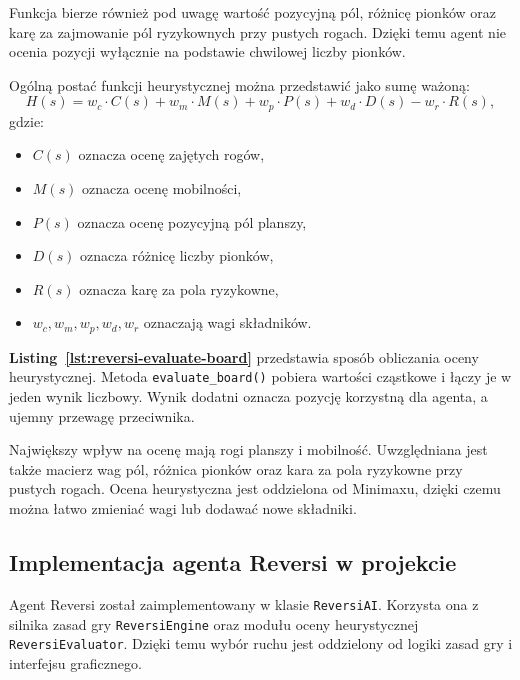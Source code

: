 Funkcja bierze również pod uwagę wartość pozycyjną pól, różnicę pionków oraz karę za zajmowanie pól ryzykownych przy pustych rogach. Dzięki temu agent nie ocenia pozycji wyłącznie na podstawie chwilowej liczby pionków.

Ogólną postać funkcji heurystycznej można przedstawić jako sumę ważoną:
\begin{equation*}
H(s) =
w_c \cdot C(s)
+ w_m \cdot M(s)
+ w_p \cdot P(s)
+ w_d \cdot D(s)
- w_r \cdot R(s),
\end{equation*}
gdzie:
\begin{itemize}
\item $C(s)$ oznacza ocenę zajętych rogów,
\item $M(s)$ oznacza ocenę mobilności,
\item $P(s)$ oznacza ocenę pozycyjną pól planszy,
\item $D(s)$ oznacza różnicę liczby pionków,
\item $R(s)$ oznacza karę za pola ryzykowne,
\item $w_c, w_m, w_p, w_d, w_r$ oznaczają wagi składników.
\end{itemize}



\textbf{Listing~\ref{lst:reversi-evaluate-board}} przedstawia sposób obliczania oceny heurystycznej. Metoda \texttt{evaluate\_board()} pobiera wartości cząstkowe i łączy je w jeden wynik liczbowy. Wynik dodatni oznacza pozycję korzystną dla agenta, a ujemny przewagę przeciwnika.

Największy wpływ na ocenę mają rogi planszy i mobilność. Uwzględniana jest także macierz wag pól, różnica pionków oraz kara za pola ryzykowne przy pustych rogach. Ocena heurystyczna jest oddzielona od Minimaxu, dzięki czemu można łatwo zmieniać wagi lub dodawać nowe składniki.

\newpage

\subsection{Implementacja agenta Reversi w projekcie}

Agent Reversi został zaimplementowany w klasie \texttt{ReversiAI}. Korzysta ona z silnika zasad gry \texttt{ReversiEngine} oraz modułu oceny heurystycznej \texttt{ReversiEvaluator}. Dzięki temu wybór ruchu jest oddzielony od logiki zasad gry i interfejsu graficznego.

